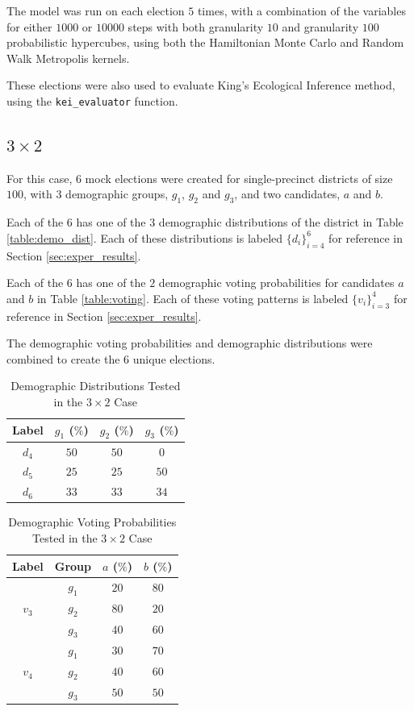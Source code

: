 The model was run on each election $5$ times, with a combination of the variables for either $1000$ or $10000$ steps with both granularity $10$ and granularity $100$ probabilistic hypercubes, using both the Hamiltonian Monte Carlo and Random Walk Metropolis kernels.

These elections were also used to evaluate King's Ecological Inference method, using the \texttt{kei\_evaluator} function.

\FloatBarrier
\subsection{$3 \times 2$}
\label{subsec:three_by_two}

For this case, $6$ mock elections were created for single-precinct districts of size $100$, with $3$ demographic groups, $g_1$, $g_2$ and $g_3$, and two candidates, $a$ and $b$.

Each of the $6$ has one of the $3$ demographic distributions of the district in Table \ref{table:demo_dist}. Each of these distributions is labeled $\{d_i\}_{i=4}^6$ for reference in Section \ref{sec:exper_results}.

Each of the $6$ has one of the $2$ demographic voting probabilities for candidates $a$ and $b$ in Table \ref{table:voting}. Each of these voting patterns is labeled $\{v_i\}_{i=3}^4$ for reference in Section \ref{sec:exper_results}.

The demographic voting probabilities and demographic distributions were combined to create the $6$ unique elections.

\begin{table}[ht]
 \centering
 \caption{Demographic Distributions Tested in the $3 \times 2$ Case}
 \label{table:demo_dist_3}
 \begin{tabular}{|c|c|c|c|}
   \hline
   Label & $g_1$ ($\%$) & $g_2$ ($\%$) & $g_3$ ($\%$) \\
   \hline
   $d_4$ & $50$ & $50$ & $0$ \\
   $d_5$ & $25$ & $25$ & $50$ \\
   $d_6$ & $33$ & $33$ & $34$ \\
  \hline
 \end{tabular}
\end{table}

\begin{table}[ht]
 \centering
 \caption{Demographic Voting Probabilities Tested in the $3 \times 2$ Case}
 \label{table:voting_3}
 \begin{tabular}{|c|c|c|c|}
   \hline
   Label & Group & $a$ ($\%$) & $b$ ($\%$) \\
   \hline
   \multirow{3}{*}{$v_3$} & $g_1$ & $20$ & $80$ \\
   & $g_2$ & $80$ & $20$ \\
   & $g_3$ & $40$ & $60$ \\
   \hline
   \multirow{3}{*}{$v_4$} & $g_1$ & $30$ & $70$ \\
   & $g_2$ & $40$ & $60$ \\
   & $g_3$ & $50$ & $50$ \\
  \hline
 \end{tabular}
\end{table}

